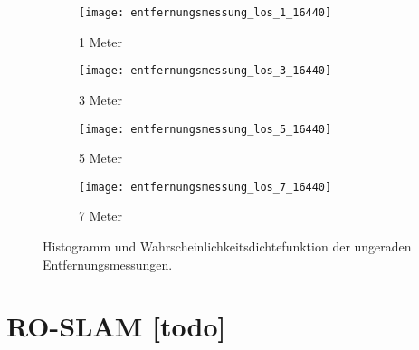 \begin{figure}[h!]
	\centering
	\begin{subfigure}[b]{0.45\textwidth}
		\centering
		\texttt{[image: entfernungsmessung\_los\_1\_16440]}
		\caption{1 Meter}
		\label{fig:entfernungsmessung_los_1_16440}
	\end{subfigure}
	\hfill
	\begin{subfigure}[b]{0.45\textwidth}
		\centering
		\texttt{[image: entfernungsmessung\_los\_3\_16440]}
		\caption{3 Meter}
		\label{fig:entfernungsmessung_los_3_16440}
	\end{subfigure}
	\bigskip
	\begin{subfigure}[b]{0.45\textwidth}
		\centering
		\texttt{[image: entfernungsmessung\_los\_5\_16440]}
		\caption{5 Meter}
		\label{fig:entfernungsmessung_los_5_16440}
	\end{subfigure}
	\hfil
	\begin{subfigure}[b]{0.45\textwidth}
		\centering
		\texttt{[image: entfernungsmessung\_los\_7\_16440]}
		\caption{7 Meter}
		\label{fig:entfernungsmessung_los_7_16440}
	\end{subfigure}
	\caption{Histogramm und Wahrscheinlichkeitsdichtefunktion der ungeraden Entfernungsmessungen.}
	\label{fig:entfernungsmessung_los_16440}
\end{figure}


\begin{comment}
--------------------------------------------------------------------------------
- Diagramme
	- \cite{kurth2003experimental}
		- Fig. 5: (1) The ground truth path with tags indicated by circles. The numbers indicate how many range measurements were received from each tag over the duration of Test 1. (2) The path estimate from dead reckoning alone. (3) The path estimate from localization using a Kalman Filter. The Filter fuses data from odometry and a gyro with absolute measurements from RF tags to produce this path estimate. Numerical results are given in Table 1. (X: position in x(m), Y: position in y(m), Ground truth path with tag locations, Dead reckoning path, Kalman filter localization path)

		
- Versuchsbeschreibung:
	- Warum wurden die uwbm da platziert wo sie jetzt stehen?
	
\end{comment}
\section{RO-SLAM [todo]}


